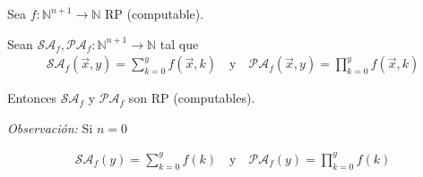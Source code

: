 \begin{teorema}{}{}
    Sea $f: \mathbb{N}^{n+1} \to \mathbb{N}$ RP (computable).

    Sean $\mathcal{SA}_f, \mathcal{PA}_f: \mathbb{N}^{n+1} \to \mathbb{N}$ 
    tal que
    \begin{gather*}
        \mathcal{SA}_f (\overrightarrow{x}, y) = 
        \sum_{k=0}^{y} f (\overrightarrow{x}, k) 
        \quad \text{y} \quad
        \mathcal{PA}_f (\overrightarrow{x},y) 
        = \prod_{k=0}^{y} f(\overrightarrow{x},k)
    \end{gather*}

    
    \medskip

    Entonces $\mathcal{SA}_f$ y $\mathcal{PA}_f$ son RP (computables).

    \bigskip
    \textit{Observación:}
    Si $n=0$

    \begin{gather*}
        \mathcal{SA}_f(y) = \sum_{k=0}^y f(k)
        \quad \text{y} \quad
        \mathcal{PA}_f (y) = \prod_{k=0}^y f(k)
    \end{gather*}
\end{teorema}

